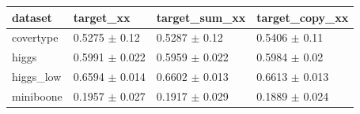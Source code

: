 \begin{tabular}{llll}
\toprule
dataset & target\_xx & target\_sum\_xx & target\_copy\_xx \\
\midrule
covertype & 0.5275 $\pm$ 0.12 & 0.5287 $\pm$ 0.12 & 0.5406 $\pm$ 0.11 \\
higgs & 0.5991 $\pm$ 0.022 & 0.5959 $\pm$ 0.022 & 0.5984 $\pm$ 0.02 \\
higgs\_low & 0.6594 $\pm$ 0.014 & 0.6602 $\pm$ 0.013 & 0.6613 $\pm$ 0.013 \\
miniboone & 0.1957 $\pm$ 0.027 & 0.1917 $\pm$ 0.029 & 0.1889 $\pm$ 0.024 \\
\bottomrule
\end{tabular}
